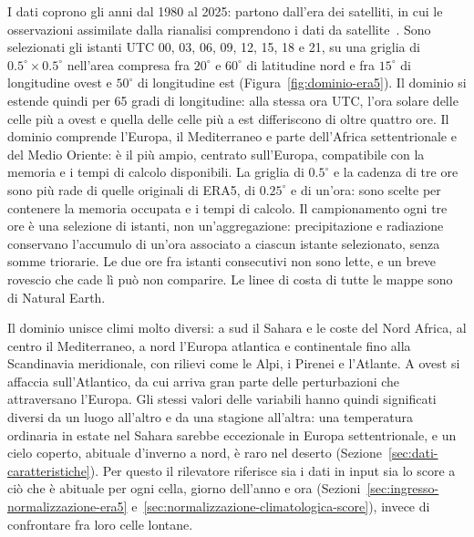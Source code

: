 I dati coprono gli anni dal 1980 al 2025: partono dall'era dei satelliti, in cui le osservazioni assimilate dalla rianalisi comprendono i dati da satellite~\cite{hersbach2020era5}. Sono selezionati gli istanti UTC 00, 03, 06, 09, 12, 15, 18 e 21, su una griglia di $0.5^\circ\times0.5^\circ$ nell'area compresa fra $20^\circ$ e $60^\circ$ di latitudine nord e fra $15^\circ$ di longitudine ovest e $50^\circ$ di longitudine est (Figura~\ref{fig:dominio-era5}). Il dominio si estende quindi per 65 gradi di longitudine: alla stessa ora UTC, l'ora solare delle celle più a ovest e quella delle celle più a est differiscono di oltre quattro ore. Il dominio comprende l'Europa, il Mediterraneo e parte dell'Africa settentrionale e del Medio Oriente: è il più ampio, centrato sull'Europa, compatibile con la memoria e i tempi di calcolo disponibili. La griglia di $0.5^\circ$ e la cadenza di tre ore sono più rade di quelle originali di ERA5, di $0.25^\circ$ e di un'ora: sono scelte per contenere la memoria occupata e i tempi di calcolo. Il campionamento ogni tre ore è una selezione di istanti, non un'aggregazione: precipitazione e radiazione conservano l'accumulo di un'ora associato a ciascun istante selezionato, senza somme triorarie. Le due ore fra istanti consecutivi non sono lette, e un breve rovescio che cade lì può non comparire. Le linee di costa di tutte le mappe sono di Natural Earth.

Il dominio unisce climi molto diversi: a sud il Sahara e le coste del Nord Africa, al centro il Mediterraneo, a nord l'Europa atlantica e continentale fino alla Scandinavia meridionale, con rilievi come le Alpi, i Pirenei e l'Atlante. A ovest si affaccia sull'Atlantico, da cui arriva gran parte delle perturbazioni che attraversano l'Europa. Gli stessi valori delle variabili hanno quindi significati diversi da un luogo all'altro e da una stagione all'altra: una temperatura ordinaria in estate nel Sahara sarebbe eccezionale in Europa settentrionale, e un cielo coperto, abituale d'inverno a nord, è raro nel deserto (Sezione~\ref{sec:dati-caratteristiche}). Per questo il rilevatore riferisce sia i dati in input sia lo score a ciò che è abituale per ogni cella, giorno dell'anno e ora (Sezioni~\ref{sec:ingresso-normalizzazione-era5} e~\ref{sec:normalizzazione-climatologica-score}), invece di confrontare fra loro celle lontane.

